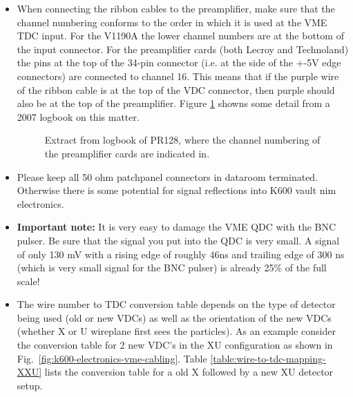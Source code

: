\documentclass[11pt]{report}
\begin{document}
\begin{itemize}
\item When connecting the ribbon cables to the preamplifier, make sure that the channel numbering
conforms to the order in which it is used at the VME TDC input. For the V1190A the lower channel numbers
are at the bottom of the input connector. For the preamplifier cards (both Lecroy and 
Technoland) the pins at the top of the 34-pin connector (i.e. at the side of the +-5V edge connectors)
are connected to channel 16. This means that if the purple wire of the ribbon cable is at the top
of the VDC connector, then purple should also be at the top of the preamplifier. 
Figure \ref{fig:k600-preamp-numbering} showns some detail from a 2007 logbook on this matter.
\begin{figure}[]
\centerline{\vspace{0cm}\hspace{0cm}
}
\centering
\caption{Extract from logbook of PR128, where the channel numbering of the preamplifier cards
are indicated in.}
\label{fig:k600-preamp-numbering}
\end{figure} 



\item Please keep all 50 ohm patchpanel connectors in dataroom terminated. 
Otherwise there is some potential for signal reflections into K600 vault nim electronics.
      
\item {\bf Important note:}
It is very easy to damage the VME QDC with the BNC pulser.
Be sure that the signal you put into the QDC is very small. A signal of only 130 mV with 
a rising edge of roughly 46ns and trailing edge of 300 ns (which is very small signal 
for the BNC pulser) is already 25\% of the full scale!


\item  The wire number to TDC conversion table depends on the type of detector
being used (old or new VDCs) as well as the orientation of the new VDCs (whether X or U wireplane
first sees the particles). As an example consider the conversion table
for 2 new VDC's in the XU configuration as shown in Fig.~\ref{fig:k600-electronics-vme-cabling}.
Table \ref{table:wire-to-tdc-mapping-XXU} lists the conversion table for a old X followed by a new XU detector setup.


\end{itemize}
\end{document}
